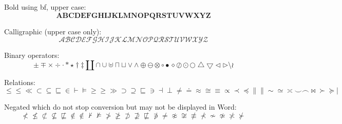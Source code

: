 Bold using bf, upper case:
\begin{equation}
\mathbf{A}  \mathbf{B}  \mathbf{C}  \mathbf{D}  \mathbf{E}  \mathbf{F}  \mathbf{G}  \mathbf{H}  \mathbf{I}  \mathbf{J}  \mathbf{K}  \mathbf{L}  \mathbf{M}  \mathbf{N}  \mathbf{O}  \mathbf{P}  \mathbf{Q}  \mathbf{R}  \mathbf{S}  \mathbf{T}  \mathbf{U}  \mathbf{V}  \mathbf{W}  \mathbf{X}  \mathbf{Y}  \mathbf{Z}
\end{equation}

Calligraphic (upper case only):
\begin{equation}
\mathcal{A}  \mathcal{B}  \mathcal{C}  \mathcal{D}  \mathcal{E}  \mathcal{F}  \mathcal{G}  \mathcal{H}  \mathcal{I}  \mathcal{J}  \mathcal{K}  \mathcal{L}  \mathcal{M}  \mathcal{N}  \mathcal{O}  \mathcal{P}  \mathcal{Q}  \mathcal{R}  \mathcal{S}  \mathcal{T}  \mathcal{U}  \mathcal{V}  \mathcal{W}  \mathcal{X}  \mathcal{Y}  \mathcal{Z}
\end{equation}

Binary operators:
\begin{equation}
\pm \mp \times \div \cdot \ast \star \dagger \ddagger \amalg \cap \cup \uplus \sqcap \sqcup \vee \wedge \oplus \ominus \otimes \circ \bullet \diamond \oslash \odot \bigcirc \bigtriangleup \bigtriangledown \triangleleft \triangleright \setminus \wr
\end{equation}

Relations:
\begin{equation}
\le \leq \ll \subset \subseteq \sqsubseteq \in \vdash \models \ge \geq \gg \supset \supseteq \sqsubseteq \ni \dashv \perp \neq \doteq \approx \cong \equiv \propto \prec \preceq \parallel \| \sim \simeq \asymp \smile \frown \bowtie \succ \succeq \mid
\end{equation}%

Negated which do not stop conversion but may not be displayed in Word:
\begin{equation}
\not< \not\leq \not\subset \not\subseteq \not\sqsubseteq \not\in \notin \not\vdash \not\models \not> \not\geq \not\supset \not\supseteq \not\sqsubseteq \not\ni \not= \not\approx \not\cong \not\equiv \not\prec \not\sim \not\simeq \not\asymp \not\succ 
\end{equation}


